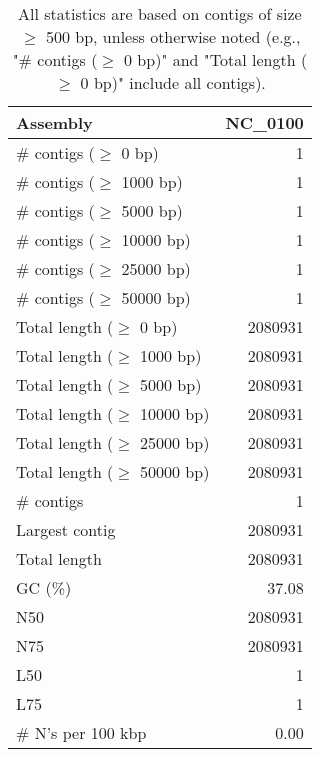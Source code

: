 \documentclass[12pt,a4paper]{article}
\begin{document}
\begin{table}[ht]
\begin{center}
\caption{All statistics are based on contigs of size $\geq$ 500 bp, unless otherwise noted (e.g., "\# contigs ($\geq$ 0 bp)" and "Total length ($\geq$ 0 bp)" include all contigs).}
\begin{tabular}{|l*{1}{|r}|}
\hline
Assembly & NC\_0100 \\ \hline
\# contigs ($\geq$ 0 bp) & 1 \\ \hline
\# contigs ($\geq$ 1000 bp) & 1 \\ \hline
\# contigs ($\geq$ 5000 bp) & 1 \\ \hline
\# contigs ($\geq$ 10000 bp) & 1 \\ \hline
\# contigs ($\geq$ 25000 bp) & 1 \\ \hline
\# contigs ($\geq$ 50000 bp) & 1 \\ \hline
Total length ($\geq$ 0 bp) & 2080931 \\ \hline
Total length ($\geq$ 1000 bp) & 2080931 \\ \hline
Total length ($\geq$ 5000 bp) & 2080931 \\ \hline
Total length ($\geq$ 10000 bp) & 2080931 \\ \hline
Total length ($\geq$ 25000 bp) & 2080931 \\ \hline
Total length ($\geq$ 50000 bp) & 2080931 \\ \hline
\# contigs & 1 \\ \hline
Largest contig & 2080931 \\ \hline
Total length & 2080931 \\ \hline
GC (\%) & 37.08 \\ \hline
N50 & 2080931 \\ \hline
N75 & 2080931 \\ \hline
L50 & 1 \\ \hline
L75 & 1 \\ \hline
\# N's per 100 kbp & 0.00 \\ \hline
\end{tabular}
\end{center}
\end{table}
\end{document}
